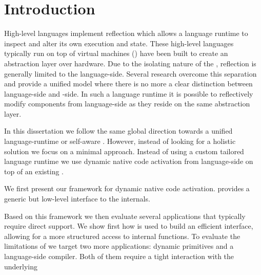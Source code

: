 
\chapter{Introduction}
\minitoc

High-level languages implement reflection which allows a language runtime to inspect and alter its own execution and state.
These high-level languages typically run on top of virtual machines (\VMs) have been built to create an abstraction layer over hardware.
Due to the isolating nature of the \VM, reflection is generally limited to the language-side.
Several research \VMs overcome this separation and provide a unified model where there is no more a clear distinction between language-side and \VM-side.
In such a language runtime it is possible to reflectively modify \VM components from language-side as they reside on the same abstraction layer.

In this dissertation we follow the same global direction towards a unified language-runtime or self-aware \VM.
However, instead of looking for a holistic solution we focus on a minimal approach.
Instead of using a custom tailored language runtime we use dynamic native code activation from language-side on top of an existing \VM.

We first present \B our framework for dynamic native code activation.
\B provides a generic but low-level interface to the \VM internals.

Based on this framework we then evaluate several applications that typically require direct \VM support.
We show first how \B is used to build an efficient \FFI interface, allowing for a more structured access to \VM internal functions.
To evaluate the limitations of \B we target two more applications: dynamic primitives and a language-side \JIT compiler.
Both of them require a tight interaction with the underlying \VM

\\
\\


